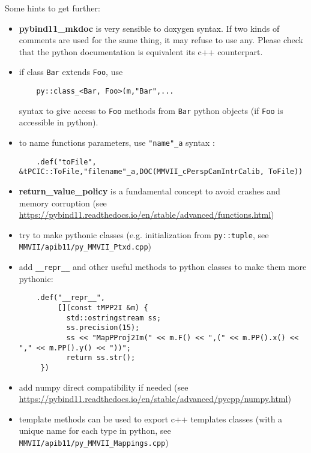 Some hints to get further:
\begin{itemize}
  \item \textbf{pybind11\_mkdoc} is very sensible to doxygen syntax. If two kinds of comments are used for the same thing,
 it may refuse to use any. Please check that the python documentation is equivalent its c++ counterpart.
  \item if class \texttt{Bar} extends \texttt{Foo}, use
\begin{lstlisting}
    py::class_<Bar, Foo>(m,"Bar",...
\end{lstlisting}
syntax to give access to \texttt{Foo} methods from \texttt{Bar} python objects (if \texttt{Foo} is accessible in python).
  \item to name functions parameters, use \texttt{"name"\_a} syntax :
\begin{lstlisting}
    .def("toFile", &tPCIC::ToFile,"filename"_a,DOC(MMVII_cPerspCamIntrCalib, ToFile))
\end{lstlisting}
  \item \textbf{return\_value\_policy} is a fundamental concept to avoid crashes and memory corruption (see \url{https://pybind11.readthedocs.io/en/stable/advanced/functions.html})
  \item try to make pythonic classes (e.g. initialization from \texttt{py::tuple}, see \texttt{MMVII/apib11/py\_MMVII\_Ptxd.cpp})
  \item add \texttt{\_\_repr\_\_} and other useful methods to python classes to make them more pythonic:
\begin{lstlisting}
    .def("__repr__",
         [](const tMPP2I &m) {
           std::ostringstream ss;
           ss.precision(15);
           ss << "MapPProj2Im(" << m.F() << ",(" << m.PP().x() << "," << m.PP().y() << "))";
           return ss.str();
     })
\end{lstlisting}
  \item add numpy direct compatibility if needed (see \url{https://pybind11.readthedocs.io/en/stable/advanced/pycpp/numpy.html})
  \item template methods can be used to export c++ templates classes (with a unique name for each type in python, see \texttt{MMVII/apib11/py\_MMVII\_Mappings.cpp})
\end{itemize}


